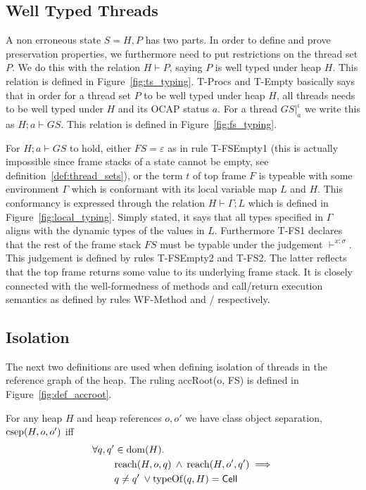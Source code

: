 \subsection{Well Typed Threads}%
\label{sub:well_typed_threads}

A non erroneous state $S = H, P$ has two parts. In order to define and
prove preservation properties, we furthermore need to put restrictions on the
thread set $P$. We do this with the relation $H \vdash P$, saying $P$ is well
typed under heap $H$. This relation is defined in Figure~\ref{fig:ts_typing}.
{\sc T-Procs} and {\sc T-Empty} basically says that in order for a thread set
$P$ to be well typed under heap $H$, all threads needs to be well typed under
$H$ and its OCAP status $a$.  For a thread $GS|_a^\iota$ we write this as $H; a
\vdash GS$. This relation is defined in Figure~\ref{fig:fs_typing}. 

For $H; a \vdash GS$ to hold, either $FS = \varepsilon$ as in rule {\sc
T-FSEmpty1} (this is actually impossible since frame stacks of a state cannot be
empty, see definition~\ref{def:thread_sets}), or the term $t$ of top frame $F$
is typeable with some environment $\Gamma$ which is conformant with its local
variable map $L$ and $H$. This conformancy is expressed through the relation $H
\vdash \Gamma; L$ which is defined in Figure~\ref{fig:local_typing}. Simply
stated, it says that all types specified in $\Gamma$ aligns with the dynamic
types of the values in $L$. Furthermore {\sc T-FS1} declares that the rest of the frame
stack $FS$ must be typable under the judgement $\vdash^{x: \sigma}$. This
judgement is defined by rules {\sc T-FSEmpty2} and {\sc T-FS2}. The latter
reflects that the top frame returns some value to its underlying frame stack. It
is closely connected with the well-formedness of methods and call\slash return
execution semantics as defined by rules {\sc WF-Method} and \ECall{}\slash\ERet{}
respectively.

\subsection{Isolation}%
\label{sub:isolation}

The next two definitions are used when defining isolation of threads in the
reference graph of the heap. The ruling accRoot(o, FS) is defined in
Figure~\ref{fig:def_accroot}.
\begin{definition}
  For any heap $H$ and heap references $o, o'$ we have class object separation,
  $\mbox{$\mathrm{csep}$}{(H, o, o')}$ iff
  \begin{align}
    \label{eq:csep_def}
    \forall q, q' &\in \mbox{$\mathrm{dom}$}{(H)}. \notag\\
    & \mbox{$\mathrm{reach}$}{(H, o, q)} \: \land \: \mbox{$\mathrm{reach}$}{(H, o', q')} \implies \notag\\ 
    &q \neq q' \: \lor \mbox{$\mathrm{typeOf}$}{(q, H)} = \mbox{$\mathsf{Cell}$}
  \end{align}
\end{definition}

